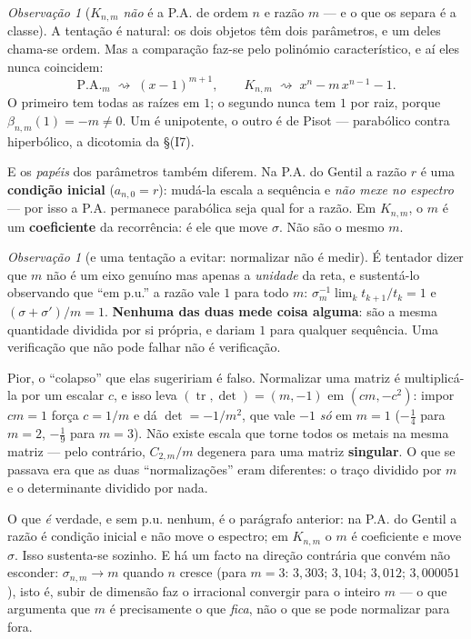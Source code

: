 \documentclass[11pt,a4paper]{article}
\theoremstyle{plain}
\theoremstyle{definition}
\theoremstyle{remark}
\newtheorem{obs}[teorema]{Observação}
\providecommand{\Comp}[2]{C_{#1,#2}}
\begin{document}
\begin{obs}[$K_{n,m}$ \emph{não} é a P.A. de ordem $n$ e razão $m$ --- e o que os separa é a classe]\label{obs:naopa}
A tentação é natural: os dois objetos têm dois parâmetros, e um deles chama-se ordem. Mas a
comparação faz-se pelo polinómio característico, e aí eles nunca coincidem:
\[
  \mathrm{P.A.}_m \;\rightsquigarrow\; (x-1)^{m+1},
  \qquad
  K_{n,m} \;\rightsquigarrow\; x^n - m\,x^{n-1} - 1 .
\]
O primeiro tem todas as raízes em $1$; o segundo nunca tem $1$ por raiz, porque
$\beta_{n,m}(1) = -m \neq 0$. Um é unipotente, o outro é de Pisot --- parabólico contra hiperbólico,
a dicotomia da \S(I7).

E os \emph{papéis} dos parâmetros também diferem. Na P.A. do Gentil a razão $r$ é uma
\textbf{condição inicial} ($a_{n,0}=r$): mudá-la escala a sequência e \emph{não mexe no espectro} ---
por isso a P.A. permanece parabólica seja qual for a razão. Em $K_{n,m}$, o $m$ é um
\textbf{coeficiente} da recorrência: é ele que move $\sigma$. Não são o mesmo $m$.

\begin{obs}[e uma tentação a evitar: normalizar não é medir]\label{obs:pu}
É tentador dizer que $m$ não é um eixo genuíno mas apenas a \emph{unidade} da reta, e sustentá-lo
observando que ``em p.u.'' a razão vale $1$ para todo $m$:
$\sigma_m^{-1}\lim_k t_{k+1}/t_k = 1$ e $(\sigma+\sigma')/m = 1$. \textbf{Nenhuma das duas mede
coisa alguma}: são a mesma quantidade dividida por si própria, e dariam $1$ para qualquer
sequência. Uma verificação que não pode falhar não é verificação.

Pior, o ``colapso'' que elas sugeririam é falso. Normalizar uma matriz é multiplicá-la por um
escalar $c$, e isso leva $(\operatorname{tr},\det) = (m,-1)$ em $(cm,-c^2)$: impor $cm=1$ força
$c = 1/m$ e dá $\det = -1/m^2$, que vale $-1$ \emph{só} em $m=1$ ($-\tfrac14$ para $m=2$,
$-\tfrac19$ para $m=3$). Não existe escala que torne todos os metais na mesma matriz --- pelo
contrário, $\Comp{2}{m}/m$ degenera para uma matriz \textbf{singular}. O que se passava era que as
duas ``normalizações'' eram diferentes: o traço dividido por $m$ e o determinante dividido por
nada.

O que \emph{é} verdade, e sem p.u. nenhum, é o parágrafo anterior: na P.A. do Gentil a razão é
condição inicial e não move o espectro; em $K_{n,m}$ o $m$ é coeficiente e move $\sigma$. Isso
sustenta-se sozinho. E há um facto na direção contrária que convém não esconder: $\sigma_{n,m} \to
m$ quando $n$ cresce (para $m=3$: $3{,}303$; $3{,}104$; $3{,}012$; $3{,}000051$), isto é, subir de
dimensão faz o irracional convergir para o inteiro $m$ --- o que argumenta que $m$ é precisamente
o que \emph{fica}, não o que se pode normalizar para fora.
\end{obs}


\end{obs}
\end{document}
